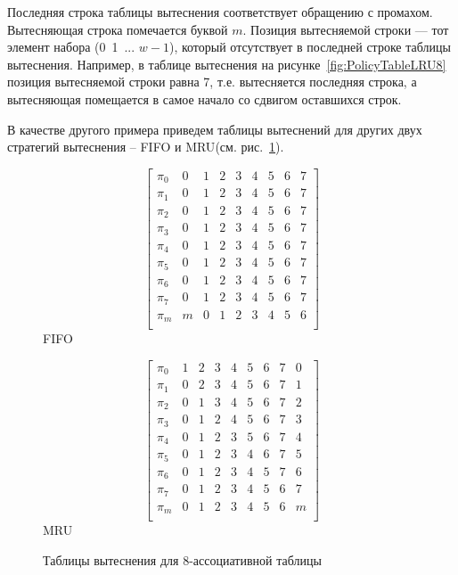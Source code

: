 \documentclass[14pt]{extreport}
\newcommand{\FIFO}{\textsf{FIFO}\xspace}
\newcommand{\MRU}{\textsf{MRU}\xspace}
\begin{document}
Последняя строка таблицы вытеснения соответствует обращению с промахом.
Вытесняющая строка помечается буквой $m$. Позиция вытесняемой строки --- тот
элемент набора (0~1~... $w{-}1$), который отсутствует в последней строке таблицы
вытеснения. Например, в таблице вытеснения на рисунке~\ref{fig:PolicyTableLRU8}
позиция вытесняемой строки равна 7, т.е. вытесняется последняя строка, а
вытесняющая помещается в самое начало со сдвигом оставшихся строк.

В качестве другого примера приведем таблицы вытеснений для других двух стратегий
вытеснения -- \FIFO и \MRU (см. рис.~\ref{fig:fifo_mru_tables}).

\begin{figure}[h] \centering
\parbox{0.4\textwidth}{
$$ \left[
     \begin{array}{c|cccccccc}
       \pi_0 & 0 & 1 & 2 & 3 & 4 & 5 & 6 & 7 \\
       \pi_1 & 0 & 1 & 2 & 3 & 4 & 5 & 6 & 7 \\
       \pi_2 & 0 & 1 & 2 & 3 & 4 & 5 & 6 & 7 \\
       \pi_3 & 0 & 1 & 2 & 3 & 4 & 5 & 6 & 7 \\
       \pi_4 & 0 & 1 & 2 & 3 & 4 & 5 & 6 & 7 \\
       \pi_5 & 0 & 1 & 2 & 3 & 4 & 5 & 6 & 7 \\
       \pi_6 & 0 & 1 & 2 & 3 & 4 & 5 & 6 & 7 \\
       \pi_7 & 0 & 1 & 2 & 3 & 4 & 5 & 6 & 7 \\
       \pi_m & m & 0 & 1 & 2 & 3 & 4 & 5 & 6 \\
     \end{array}
   \right]$$
\center \FIFO} \qquad
\parbox{0.4\textwidth}{
$$ \left[
     \begin{array}{c|cccccccc}
       \pi_0 & 1 & 2 & 3 & 4 & 5 & 6 & 7 & 0 \\
       \pi_1 & 0 & 2 & 3 & 4 & 5 & 6 & 7 & 1 \\
       \pi_2 & 0 & 1 & 3 & 4 & 5 & 6 & 7 & 2 \\
       \pi_3 & 0 & 1 & 2 & 4 & 5 & 6 & 7 & 3 \\
       \pi_4 & 0 & 1 & 2 & 3 & 5 & 6 & 7 & 4 \\
       \pi_5 & 0 & 1 & 2 & 3 & 4 & 6 & 7 & 5 \\
       \pi_6 & 0 & 1 & 2 & 3 & 4 & 5 & 7 & 6 \\
       \pi_7 & 0 & 1 & 2 & 3 & 4 & 5 & 6 & 7 \\
       \pi_m & 0 & 1 & 2 & 3 & 4 & 5 & 6 & m \\
     \end{array}
   \right]$$
\center \MRU } \caption{Таблицы вытеснения для 8-ассоциативной
таблицы}\label{fig:fifo_mru_tables}
\end{figure}
\end{document}
